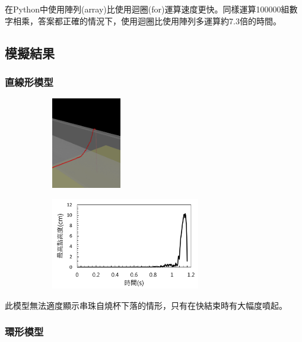 \documentclass[11pt,twoside,b5paper]{article}
\begin{document}
在Python中使用陣列(array)比使用迴圈(for)運算速度更快。同樣運算100000組數字相乘，答案都正確的情況下，使用迴圈比使用陣列多運算約7.3倍的時間。

\subsection{模擬結果}

\subsubsection{直線形模型}

\begin{figure}[H]
    \centering
    \begin{subfigure}[t]{0.3\linewidth}
    \includegraphics[height=4cm]{1.png}
    \end{subfigure}
    \begin{subfigure}[t]{0.65\linewidth}
    \includegraphics[height=4cm]{1a.PNG}
    \end{subfigure}
\end{figure}

此模型無法適度顯示串珠自燒杯下落的情形，只有在快結束時有大幅度噴起。

\subsubsection{環形模型}
\end{document}
